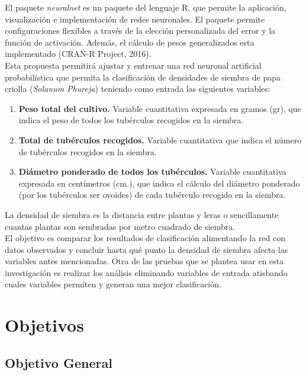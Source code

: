 El paquete \textit{neuralnet} es un paquete del lenguaje R, que permite la aplicación, visualización e implementación de redes neuronales. El paquete permite configuraciones flexibles a través de la elección personalizada del error y la función de activación. Además, el cálculo de pesos generalizados esta implementado (CRAN-R Project, 2016).\\

Esta propuesta permitirá ajustar y entrenar una red neuronal artificial probabilística que permita la clasificación de densidades de siembra de papa criolla (\textit{Solanum Phureja}) teniendo como entrada las siguientes variables: 

\begin{enumerate}
    \item{\textbf{Peso total del cultivo.} Variable cuantitativa expresada en gramos (gr), que indica el peso de todos los tubérculos recogidos en la siembra.}
	\item{\textbf{Total de tubérculos recogidos.} Variable cuantitativa que indica el número de tubérculos recogidos en la siembra.}
	\item{\textbf{Diámetro ponderado de todos los tubérculos.} Variable cuantitativa expresada en centímetros (cm.), que indica el cálculo del diámetro ponderado (por los tubérculos ser ovoides) de cada tubérculo recogido en la siembra.}
\end{enumerate}

La densidad de siembra es la distancia entre plantas y leras o sencillamente cuantas plantas son sembradas por metro cuadrado de siembra.\\

El objetivo es comparar los resultados de clasificación alimentando la red con datos observados y concluir hasta qué punto la densidad de siembra afecta las variables antes mencionadas. Otra de las pruebas que se plantea usar en esta investigación es realizar los análisis eliminando variables de entrada atisbando cuales variables permiten y generan una mejor clasificación.\\

\section{Objetivos}

\subsection{Objetivo General}

